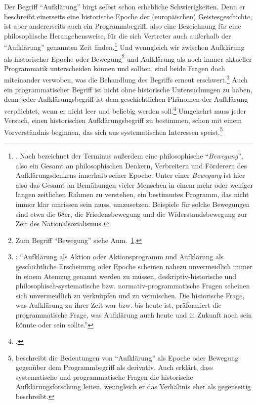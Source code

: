 Der Begriff \enquote{Aufklärung} birgt selbst schon erhebliche
Schwierigkeiten. Denn er beschreibt einerseits eine historische Epoche der
(europäischen) Geistesgeschichte, ist aber andererseits auch ein
Programmbegriff, also eine Bezeichnung für eine philosophische Herangehensweise,
für die sich Vertreter auch außerhalb der \enquote{Aufklärung} genannten Zeit
finden.\footnote{\label{Anmerkung:ScholzundderBegriffEinerBewegung}\cite[Vgl.][S.~28\,f.]{Scholz:KantsAufklaerungsprogramm2009}.
Nach  bezeichnet der Terminus außerdem eine philosophische
\enquote{\emph{Bewegung}}, also ein Gesamt an philosophischen Denkern, Verbreitern und Förderern
des Aufklärungsdenkens innerhalb seiner Epoche. Unter einer \emph{Bewegung} ist
hier also das Gesamt an Bemühungen vieler Menschen in einem mehr oder weniger
langen zeitlichen Rahmen zu verstehen, ein bestimmtes Programm, das nicht immer klar umrissen sein muss,
umzusetzen. Beispiele für solche Bewegungen sind etwa die 68er, die
Friedensbewegung und die Widerstandsbewegung zur Zeit des Nationalsozialismus.}
Und wenngleich wir zwischen Aufklärung als historischer Epoche oder
Bewegung\footnote{Zum Begriff \enquote{Bewegung} siehe
Anm.~\ref{Anmerkung:ScholzundderBegriffEinerBewegung}.} und Aufklärung als noch
immer aktueller Programmatik unterscheiden können und sollten, sind beide Fragen
doch miteinander verwoben, was die Behandlung des Begriffs erneut
erschwert.\footnote{\cite[Vgl.][9]{Schneiders:HoffnungaufVernunft1990}:
\enquote{Aufklärung als Aktion oder Aktionsprogramm und Aufklärung als
geschichtliche Erscheinung oder Epoche scheinen nahezu unvermeidlich immer in
einem Atemzug genannt werden zu müssen, deskriptiv-historische und
philosophisch-systematische bzw.
normativ-programmatische Fragen scheinen sich unvermeidlich zu verknüpfen und zu
vermischen. Die historische Frage, was Aufklärung zu ihrer Zeit war bzw. bis
heute ist, präformiert die programmatische Frage, was Aufklärung auch heute und
in Zukunft noch sein könnte oder sein sollte.}} Auch
ein programmatischer Begriff ist nicht ohne historische Untersuchungen zu haben,
denn jeder Aufklärungsbegriff ist dem geschichtlichen Phänomen der Aufklärung
verpflichtet, wenn er nicht leer und beliebig werden
soll.\footnote{\cite[Vgl.][4]{Bubner:WaskannsollunddarfPhilosophie?1978}.} 
Umgekehrt muss jeder Versuch, einen historischen Aufklärungsbegriff zu
bestimmen, schon mit einem Vorverständnis beginnen, das sich aus systematischen Interessen
speist.\footnote{\textcite[][28]{Scholz:KantsAufklaerungsprogramm2009}
beschreibt die Bedeutungen von \enquote{Aufklärung} als Epoche oder Bewegung
gegenüber dem Programmbegriff als derivativ. Auch
\textcite[][\pno~9\,f.]{Schneiders:HoffnungaufVernunft1990} erklärt, dass
systematische und programmatische Fragen die historische Aufklärungsforschung
leiten, wenngleich er das Verhältnis eher als gegenseitig beschreibt.}

